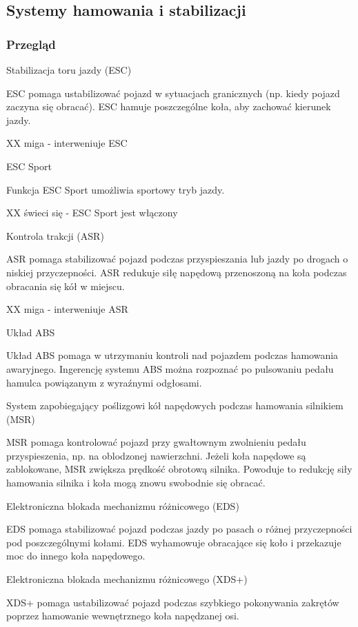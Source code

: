 \subsection{Systemy hamowania i stabilizacji}

\subsubsection{Przegląd}

Stabilizacja toru jazdy (ESC)

ESC pomaga ustabilizować pojazd w sytuacjach granicznych (np. kiedy pojazd zaczyna się obracać). ESC hamuje poszczególne koła, aby zachować kierunek
jazdy.

XX miga - interweniuje ESC

ESC Sport

Funkcja ESC Sport umożliwia sportowy tryb jazdy.

XX świeci się - ESC Sport jest włączony

Kontrola trakcji (ASR)

ASR pomaga stabilizować pojazd podczas przyspieszania lub jazdy po drogach o niskiej przyczepności.
ASR redukuje siłę napędową przenoszoną na koła podczas obracania się kół w miejscu.

XX miga - interweniuje ASR

Układ ABS

Układ ABS pomaga w utrzymaniu kontroli nad pojazdem podczas hamowania awaryjnego. Ingerencję systemu ABS można rozpoznać po pulsowaniu pedału hamulca powiązanym z wyraźnymi odgłosami.

System zapobiegający poślizgowi kół napędowych podczas hamowania silnikiem (MSR)

MSR pomaga kontrolować pojazd przy gwałtownym zwolnieniu pedału przyspieszenia, np. na oblodzonej nawierzchni. Jeżeli koła napędowe są zablokowane, MSR zwiększa prędkość obrotową silnika. Powoduje to redukcję siły hamowania silnika i koła mogą znowu swobodnie się obracać.

Elektroniczna blokada mechanizmu różnicowego (EDS)

EDS pomaga stabilizować pojazd podczas jazdy po pasach o różnej przyczepności pod poszczególnymi kołami. EDS wyhamowuje obracające się koło i przekazuje moc do innego koła napędowego.

Elektroniczna blokada mechanizmu różnicowego (XDS+)

XDS+ pomaga ustabilizować pojazd podczas szybkiego pokonywania zakrętów poprzez hamowanie wewnętrznego koła napędzanej osi.

